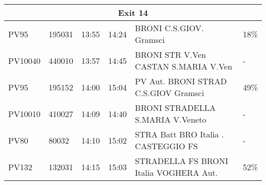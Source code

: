 \begin{landscape}
\begin{table}[ht]
\begin{tabular}{|llllll|}
\multicolumn{6}{|c|}{Exit 14}                                                                                                                                                                                                                                                                                                                                                             \\ \hline
\multicolumn{1}{|l|}{PV95}          & \multicolumn{1}{l|}{195031}                                    & \multicolumn{1}{l|}{13:55}                                            & \multicolumn{1}{l|}{14:24}                                        & \multicolumn{1}{l|}{BRONI  C.S.GIOV. Gramsci}                             & 18\%                                                       \\ \hline
\multicolumn{1}{|l|}{PV10040}       & \multicolumn{1}{l|}{440010}                                    & \multicolumn{1}{l|}{13:57}                                            & \multicolumn{1}{l|}{14:45}                                        & \multicolumn{1}{l|}{BRONI   STR V.Ven   CASTAN     S.MARIA V.Ven}         & -                                                          \\ \hline
\multicolumn{1}{|l|}{PV95}          & \multicolumn{1}{l|}{195152}                                    & \multicolumn{1}{l|}{14:00}                                            & \multicolumn{1}{l|}{15:04}                                        & \multicolumn{1}{l|}{PV Aut.   BRONI   STRAD     C.S.GIOV Gramsci}         & 49\%                                                       \\ \hline
\multicolumn{1}{|l|}{PV10010}       & \multicolumn{1}{l|}{410027}                                    & \multicolumn{1}{l|}{14:09}                                            & \multicolumn{1}{l|}{14:40}                                        & \multicolumn{1}{l|}{BRONI   STRADELLA   S.MARIA V.Veneto}                 & -                                                          \\ \hline
\multicolumn{1}{|l|}{PV80}          & \multicolumn{1}{l|}{80032}                                     & \multicolumn{1}{l|}{14:10}                                            & \multicolumn{1}{l|}{15:02}                                        & \multicolumn{1}{l|}{STRA Batt BRO Italia . CASTEGGIO FS}                  & -                                                          \\ \hline
\multicolumn{1}{|l|}{PV132}         & \multicolumn{1}{l|}{132031}                                    & \multicolumn{1}{l|}{14:15}                                            & \multicolumn{1}{l|}{15:03}                                        & \multicolumn{1}{l|}{STRADELLA FS   BRONI Italia   VOGHERA   Aut.}         & 52\%                                                       \\ \hline

\end{tabular}
\end{table}
\end{landscape}
